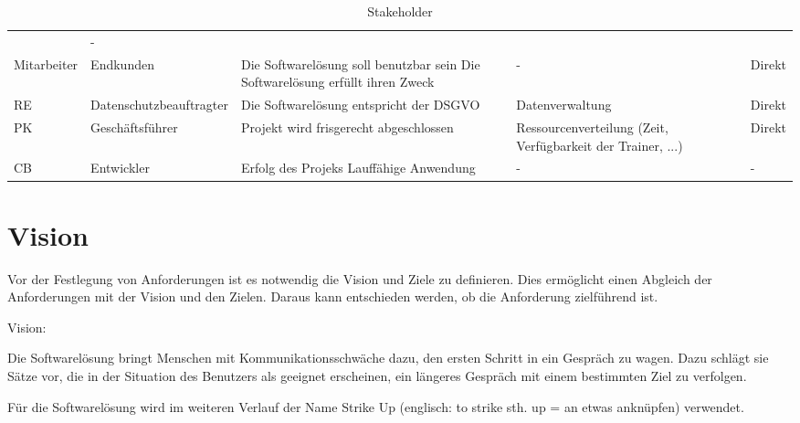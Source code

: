 \begin{table}[H]
{\begin{tabularx}{\linewidth}{|X|X|X|X|X|}
                 & -
            \\
            \cline{1-5}
            Mitarbeiter
                 & Endkunden
                 & Die Softwarelösung soll benutzbar sein \newline
            Die Softwarelösung erfüllt ihren Zweck
                 & -
                 & Direkt
            \\
            \cline{1-5}
            RE
                 & Datenschutzbeauftragter
                 & Die Softwarelösung entspricht der DSGVO
                 & Datenverwaltung
                 & Direkt
            \\
            \cline{1-5}
            PK
                 & Geschäftsführer
                 & Projekt wird frisgerecht abgeschlossen
                 & Ressourcenverteilung (Zeit, Verfügbarkeit der Trainer, ...)
                 & Direkt
            \\
            \cline{1-5}
            CB
                 & Entwickler
                 & Erfolg des Projeks \newline
            Lauffähige Anwendung
                 & -
                 & -
            \\
            \hline
        \end{tabularx}
    }
    \caption{Stakeholder}
    \label{tab:stakeholder}
\end{table}


\section{Vision}
\label{sec:vision}

Vor der Festlegung von Anforderungen ist es notwendig die Vision und Ziele zu definieren. Dies ermöglicht einen Abgleich der Anforderungen mit der Vision und den Zielen. Daraus kann entschieden werden, ob die Anforderung zielführend ist. \cite[S.~456~ff.]{Balzert:Lehrbuch-der-softwaretechnik}

Vision:
\par
\begingroup
\leftskip=30pt
\noindent
Die Softwarelösung bringt Menschen mit Kommunikationsschwäche dazu, den ersten Schritt in ein Gespräch zu wagen. Dazu schlägt sie Sätze vor, die in der Situation des Benutzers als geeignet erscheinen, ein längeres Gespräch mit einem bestimmten Ziel zu verfolgen.

Für die Softwarelösung wird im weiteren Verlauf der Name \glqq{}Strike Up\grqq{} (englisch: \glqq{}to strike sth. up\grqq{} = \glqq{}an etwas anknüpfen\grqq{}) verwendet.

